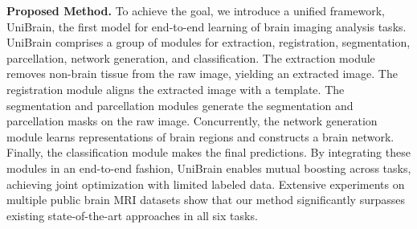 \noindent\textbf{Proposed Method.} To achieve the goal, we introduce a unified framework, UniBrain, the first model for end-to-end learning of brain imaging analysis tasks. UniBrain comprises a group of modules for extraction, registration, segmentation, parcellation, network generation, and classification. The extraction module removes non-brain tissue from the raw image, yielding an extracted image. The registration module aligns the extracted image with a template. 
The segmentation and parcellation modules generate the segmentation and parcellation masks on the raw image.
Concurrently, the network generation module learns representations of brain regions and constructs a brain network. 
Finally, the classification module makes the final predictions.
By integrating these modules in an end-to-end fashion, UniBrain enables mutual boosting across tasks, achieving joint optimization with limited labeled data.
Extensive experiments on multiple public brain MRI datasets show that our method significantly surpasses existing state-of-the-art approaches in all six tasks.
